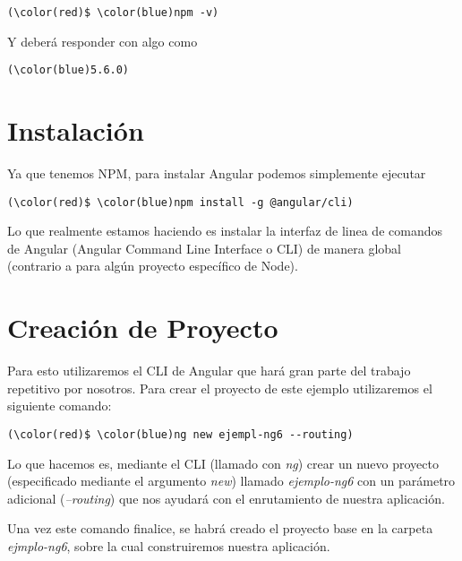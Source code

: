 \documentclass{article}
\begin{document}
\begin{Verbatim}[fontsize=\small,commandchars=\\\(\)]
    (\color(red)$ \color(blue)npm -v)
\end{Verbatim}

Y deber\'a responder con algo como

\begin{Verbatim}[fontsize=\small,commandchars=\\\(\)]
    (\color(blue)5.6.0)
\end{Verbatim}


\section{Instalaci\'on}
Ya que tenemos NPM, para instalar Angular podemos simplemente ejecutar 

\begin{Verbatim}[fontsize=\small,commandchars=\\\(\)]
    (\color(red)$ \color(blue)npm install -g @angular/cli)
\end{Verbatim}

Lo que realmente estamos haciendo es instalar la interfaz de linea de comandos de Angular (Angular Command Line Interface o CLI) de manera global (contrario a para alg\'un proyecto espec\'ifico de Node).



\section{Creaci\'on de Proyecto}
Para esto utilizaremos el CLI de Angular que har\'a gran parte del trabajo repetitivo por nosotros. Para crear el proyecto de este ejemplo utilizaremos el siguiente comando:

\begin{Verbatim}[fontsize=\small,commandchars=\\\(\)]
    (\color(red)$ \color(blue)ng new ejempl-ng6 --routing)
\end{Verbatim}

Lo que hacemos es, mediante el CLI (llamado con \textit{ng}) crear un nuevo proyecto (especificado mediante el argumento \textit{new}) llamado \textit{ejemplo-ng6} con un par\'ametro adicional (\textit{--routing}) que nos ayudar\'a con el enrutamiento de nuestra aplicaci\'on.

Una vez este comando finalice, se habr\'a creado el proyecto base en la carpeta \textit{ejmplo-ng6}, sobre la cual construiremos nuestra aplicaci\'on.
\end{document}
